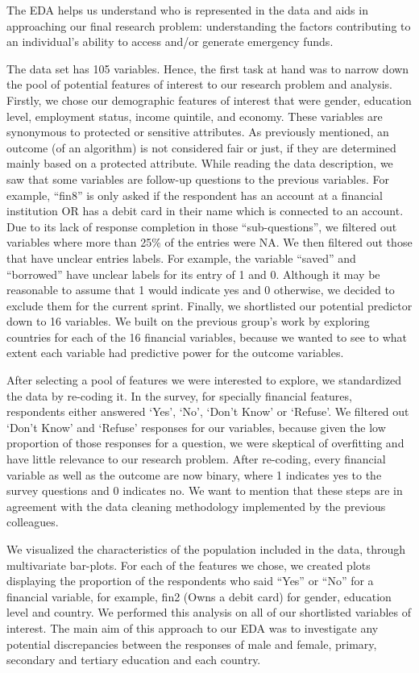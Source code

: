 \documentclass[12pt]{article}
\begin{document}
The EDA helps us understand who is represented in the data and aids in
approaching our final research problem: understanding the factors
contributing to an individual's ability to access and/or generate
emergency funds.

The data set has 105 variables. Hence, the first task at hand was to
narrow down the pool of potential features of interest to our research
problem and analysis. Firstly, we chose our demographic features of
interest that were gender, education level, employment status, income
quintile, and economy. These variables are synonymous to protected or
sensitive attributes. As previously mentioned, an outcome (of an
algorithm) is not considered fair or just, if they are determined mainly
based on a protected attribute. While reading the data description, we
saw that some variables are follow-up questions to the previous
variables. For example, ``fin8'' is only asked if the respondent has an
account at a financial institution OR has a debit card in their name
which is connected to an account. Due to its lack of response completion
in those ``sub-questions'', we filtered out variables where more than
25\% of the entries were NA. We then filtered out those that have
unclear entries labels. For example, the variable ``saved'' and
``borrowed'' have unclear labels for its entry of 1 and 0. Although it
may be reasonable to assume that 1 would indicate yes and 0 otherwise,
we decided to exclude them for the current sprint. Finally, we
shortlisted our potential predictor down to 16 variables. We built on
the previous group's work by exploring countries for each of the 16
financial variables, because we wanted to see to what extent each
variable had predictive power for the outcome variables.

After selecting a pool of features we were interested to explore, we
standardized the data by re-coding it. In the survey, for specially
financial features, respondents either answered `Yes', `No', `Don't
Know' or `Refuse'. We filtered out `Don't Know' and `Refuse' responses
for our variables, because given the low proportion of those responses
for a question, we were skeptical of overfitting and have little
relevance to our research problem. After re-coding, every financial
variable as well as the outcome are now binary, where 1 indicates yes to
the survey questions and 0 indicates no. We want to mention that these
steps are in agreement with the data cleaning methodology implemented by
the previous colleagues.

We visualized the characteristics of the population included in the
data, through multivariate bar-plots. For each of the features we chose,
we created plots displaying the proportion of the respondents who said
``Yes'' or ``No'' for a financial variable, for example, fin2 (Owns a
debit card) for gender, education level and country. We performed this
analysis on all of our shortlisted variables of interest. The main aim
of this approach to our EDA was to investigate any potential
discrepancies between the responses of male and female, primary,
secondary and tertiary education and each country.
\end{document}
